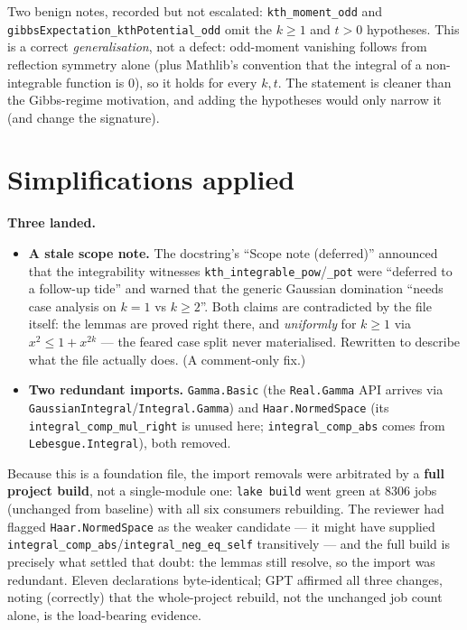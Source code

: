 \documentclass[11pt]{article}
\begin{document}
Two benign notes, recorded but not escalated: \texttt{kth\_moment\_odd} and
\texttt{gibbsExpectation\_kthPotential\_odd} omit the $k\ge1$ and $t>0$ hypotheses. This is a correct
\emph{generalisation}, not a defect: odd-moment vanishing follows from reflection symmetry alone (plus
Mathlib's convention that the integral of a non-integrable function is $0$), so it holds for every $k,t$. The
statement is cleaner than the Gibbs-regime motivation, and adding the hypotheses would only narrow it (and
change the signature).

\section{Simplifications applied}
\textbf{Three landed.}
\begin{itemize}[noitemsep]
  \item \textbf{A stale scope note.} The docstring's ``Scope note (deferred)'' announced that the
    integrability witnesses \texttt{kth\_integrable\_pow}/\texttt{\_pot} were ``deferred to a follow-up tide''
    and warned that the generic Gaussian domination ``needs case analysis on $k=1$ vs $k\ge2$''. Both claims
    are contradicted by the file itself: the lemmas are proved right there, and \emph{uniformly} for $k\ge1$
    via $x^2\le1+x^{2k}$ --- the feared case split never materialised. Rewritten to describe what the file
    actually does. (A comment-only fix.)
  \item \textbf{Two redundant imports.} \texttt{Gamma.Basic} (the \texttt{Real.Gamma} API arrives via
    \texttt{GaussianIntegral}/\texttt{Integral.Gamma}) and \texttt{Haar.NormedSpace} (its
    \texttt{integral\_comp\_mul\_right} is unused here; \texttt{integral\_comp\_abs} comes from
    \texttt{Lebesgue.Integral}), both removed.
\end{itemize}
Because this is a foundation file, the import removals were arbitrated by a \textbf{full project build}, not a
single-module one: \texttt{lake build} went green at $8306$ jobs (unchanged from baseline) with all six
consumers rebuilding. The reviewer had flagged \texttt{Haar.NormedSpace} as the weaker candidate --- it might
have supplied \texttt{integral\_comp\_abs}/\texttt{integral\_neg\_eq\_self} transitively --- and the full
build is precisely what settled that doubt: the lemmas still resolve, so the import was redundant. Eleven
declarations byte-identical; GPT affirmed all three changes, noting (correctly) that the whole-project rebuild,
not the unchanged job count alone, is the load-bearing evidence.
\end{document}
